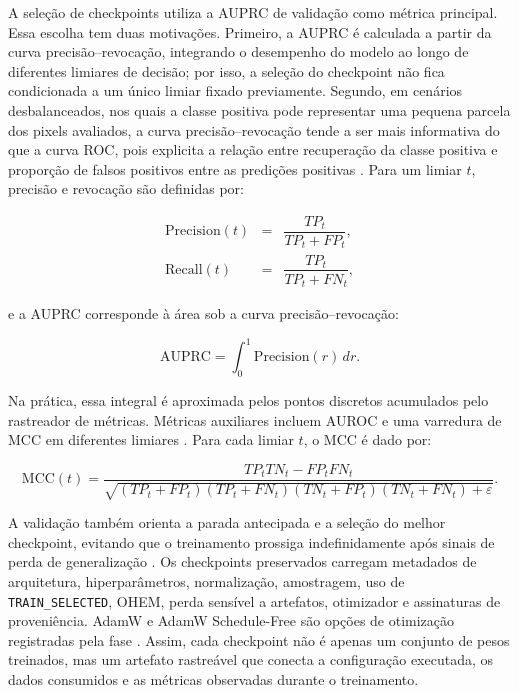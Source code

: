 A seleção de checkpoints utiliza a AUPRC de validação como métrica principal.
Essa escolha tem duas motivações. Primeiro, a AUPRC é calculada a partir da curva
precisão--revocação, integrando o desempenho do modelo ao longo de diferentes
limiares de decisão; por isso, a seleção do checkpoint não fica condicionada a
um único limiar fixado previamente. Segundo, em cenários desbalanceados, nos
quais a classe positiva pode representar uma pequena parcela dos pixels
avaliados, a curva precisão--revocação tende a ser mais informativa do que a
curva ROC, pois explicita a relação entre recuperação da classe positiva e
proporção de falsos positivos entre as predições positivas
\cite{saito2015precision}. Para um limiar $t$, precisão e revocação são
definidas por:

\begin{equation}
\begin{array}{rcl}
    \mathrm{Precision}(t) &=& \dfrac{TP_t}{TP_t+FP_t},\\[0.6em]
    \mathrm{Recall}(t) &=& \dfrac{TP_t}{TP_t+FN_t},
\end{array}
\label{eq:precision_recall}
\end{equation}

e a AUPRC corresponde à área sob a curva precisão--revocação:

\begin{equation}
    \mathrm{AUPRC} =
    \int_0^1 \mathrm{Precision}(r)\,dr .
    \label{eq:auprc}
\end{equation}

Na prática, essa integral é aproximada pelos pontos discretos acumulados pelo
rastreador de métricas. Métricas auxiliares incluem AUROC e uma varredura de MCC
em diferentes limiares \cite{fawcett2006roc,matthews1975comparison}. Para cada
limiar $t$, o MCC é dado por:

\begin{equation}
    \mathrm{MCC}(t)=
    \frac{
    TP_tTN_t-FP_tFN_t
    }{
    \sqrt{
    (TP_t+FP_t)(TP_t+FN_t)(TN_t+FP_t)(TN_t+FN_t)+\varepsilon
    }
    } .
    \label{eq:mcc_validacao}
\end{equation}

A validação também orienta a parada antecipada e a seleção do melhor checkpoint,
evitando que o treinamento prossiga indefinidamente após sinais de perda de
generalização \cite{prechelt1998automatic}. Os checkpoints preservados carregam
metadados de arquitetura, hiperparâmetros, normalização, amostragem, uso de
\texttt{TRAIN\_SELECTED}, OHEM, perda sensível a artefatos, otimizador e
assinaturas de proveniência. AdamW e AdamW Schedule-Free são opções de
otimização registradas pela fase
\cite{loshchilov2019decoupled,defazio2024road}. Assim, cada checkpoint não é
apenas um conjunto de pesos treinados, mas um artefato rastreável que conecta a
configuração executada, os dados consumidos e as métricas observadas durante o
treinamento.

